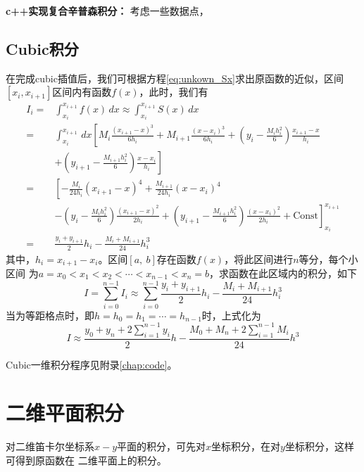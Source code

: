 \begin{example}
	\textbf{c++实现复合辛普森积分：} 考虑一些数据点，
	
\end{example}

\subsection{Cubic积分}
在完成cubic插值后，我们可根据方程\eqref{eq:unkown_Sx}求出原函数的近似，区间$[x_i, x_{i+1}]$区间内有函数$f(x)$，此时，我们有
\begin{equation}
	\begin{aligned}
		I_i =& \int_{x_i}^{x_{i+1}} f(x) \, dx \approx \int_{x_i}^{x_{i+1}} S(x) \, dx \\
		=& \int_{x_i}^{x_{i+1}} \, dx \left[ M_i \frac{\left(x_{i+1}-x\right)^3}{6 h_i}+M_{i+1} \frac{\left(x-x_i\right)^3}{6 h_i}+\left(y_i-\frac{M_i h_i^2}{6}\right) \frac{x_{i+1}-x}{h_i} \right. \\
		 &\left. + \left(y_{i+1}-\frac{M_{i+1} h_i^2}{6}\right) \frac{x-x_i}{h_i} \right]	\\
		=& \left[ -\frac{M_i}{24h_i} \left(x_{i+1}-x\right)^4 + \frac{M_{i+1}}{24h_i}\left(x-x_i\right)^4 \right. \\
		 &\left. -\left(y_i-\frac{M_i h_i^2}{6}\right) \frac{(x_{i+1}-x)^2}{2h_i} + \left(y_{i+1}-\frac{M_{i+1} h_i^2}{6}\right) \frac{(x-x_i)^2}{2h_i} + \text{Const} \right]_{x_i}^{x_{i+1}}	\\
		=& \frac{y_i + y_{i+1}}{2} h_i - \frac{M_{i} + M_{i+1}}{24} h_i^3
	\end{aligned}
\end{equation} 
其中，$h_i = x_{i+1}-x_{i}$。区间$[a,\ b]$存在函数$f(x)$，将此区间进行$n$等分，每个小区间
为$a = x_0 < x_1 < x_2 < \cdots < x_{n-1} < x_n = b $，求函数在此区域内的积分，如下
\begin{equation}
	I = \sum_{i=0}^{n-1} I_{i} \approx \sum_{i=0}^{n-1} \frac{y_i + y_{i+1}}{2} h_i - \frac{M_{i} + M_{i+1}}{24} h_i^3
\end{equation} 
当为等距格点时，即$h = h_0 = h_1 =\cdots = h_{n-1}$时，上式化为
\begin{equation}
	I\approx\frac{y_0+y_n+2\sum_{i=1}^{n-1}y_i}{2}h-\frac{M_0+M_n+2\sum_{i=1}^{n-1}M_i}{24}h^3
    \label{eq:cubic-int-equidistant}
\end{equation} 

Cubic一维积分程序见附录\ref{chap:code}。

\section{二维平面积分}
对二维笛卡尔坐标系$x-y$平面的积分，可先对$x$坐标积分，在对$y$坐标积分，这样可得到原函数在
二维平面上的积分。
